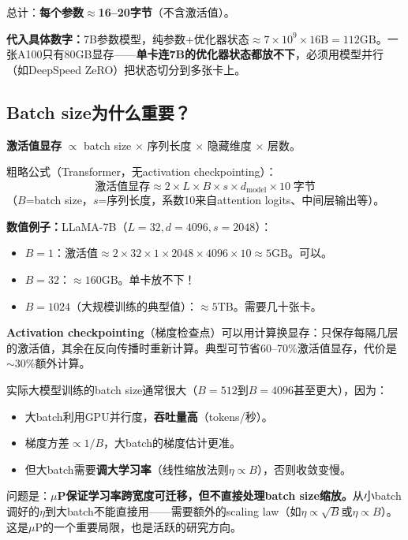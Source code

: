 \documentclass[11pt,a4paper]{article}
\begin{document}
总计：\textbf{每个参数$\approx$16--20字节}（不含激活值）。

\textbf{代入具体数字：}7B参数模型，纯参数+优化器状态$\approx 7\times 10^9\times 16\text{B} = 112\text{GB}$。一张A100只有80GB显存——\textbf{单卡连7B的优化器状态都放不下}，必须用模型并行（如DeepSpeed ZeRO）把状态切分到多张卡上。

\subsection*{Batch size为什么重要？}

\textbf{激活值显存} $\propto$ batch size $\times$ 序列长度 $\times$ 隐藏维度 $\times$ 层数。

粗略公式（Transformer，无activation checkpointing）：
\[
\text{激活值显存} \approx 2\times L\times B\times s\times d_{\text{model}} \times 10 \;\text{字节}
\]
（$B$=batch size，$s$=序列长度，系数10来自attention logits、中间层输出等）。

\textbf{数值例子：}LLaMA-7B（$L=32, d=4096, s=2048$）：
\begin{itemize}[leftmargin=*]
\item $B=1$：激活值$\approx 2\times 32\times 1\times 2048\times 4096\times 10 \approx 5\text{GB}$。可以。
\item $B=32$：$\approx 160\text{GB}$。单卡放不下！
\item $B=1024$（大规模训练的典型值）：$\approx 5\text{TB}$。需要几十张卡。
\end{itemize}

\textbf{Activation checkpointing}（梯度检查点）可以用计算换显存：只保存每隔几层的激活值，其余在反向传播时重新计算。典型可节省60--70\%激活值显存，代价是$\sim$30\%额外计算。

\begin{keyinsight}
实际大模型训练的batch size通常很大（$B=512$到$B=4096$甚至更大），因为：
\begin{itemize}[leftmargin=*]
\item 大batch利用GPU并行度，\textbf{吞吐量高}（tokens/秒）。
\item 梯度方差$\propto 1/B$，大batch的梯度估计更准。
\item 但大batch需要\textbf{调大学习率}（线性缩放法则$\eta\propto B$），否则收敛变慢。
\end{itemize}

问题是：\textbf{$\mu$P保证学习率跨宽度可迁移，但不直接处理batch size缩放。}从小batch调好的$\eta$到大batch不能直接用——需要额外的scaling law（如$\eta\propto\sqrt{B}$或$\eta\propto B$）。这是$\mu$P的一个重要局限，也是活跃的研究方向。
\end{keyinsight}
\end{document}
